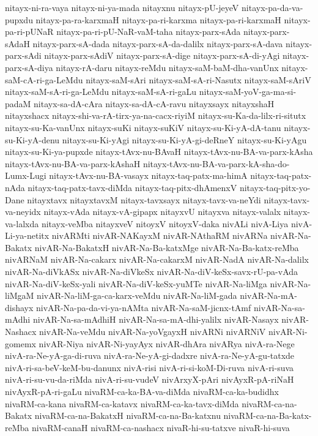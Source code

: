 {nitayx-ni-ra-vaya
nitayx-ni-ya-mada
nitayxnu
nitayx-pU-jeyeV
nitayx-pa-da-va-pupxdu
nitayx-pa-ra-karxmaH
nitayx-pa-ri-karxma
nitayx-pa-ri-karxmaH
nitayx-pa-ri-pUNaR
nitayx-pa-ri-pU-NaR-vaM-taha
nitayx-parx-sAda
nitayx-parx-sAdaH
nitayx-parx-sA-dada
nitayx-parx-sA-da-dalilx
nitayx-parx-sA-dava
nitayx-parx-sAdi
nitayx-parx-sAdiV
nitayx-parx-sA-dige
nitayx-parx-sA-di-yAgi
nitayx-parx-sA-diya
nitayx-rA-daru
nitayx-reMdu
nitayx-saM-baM-dha-vanUnx
nitayx-saM-cA-ri-ga-LeMdu
nitayx-saM-sAri
nitayx-saM-sA-ri-Nasutx
nitayx-saM-sAriV
nitayx-saM-sA-ri-ga-LeMdu
nitayx-saM-sA-ri-gaLu
nitayx-saM-yoV-ga-ma-si-padaM
nitayx-sa-dA-cAra
nitayx-sa-dA-cA-ravu
nitayxsayx
nitayxshaH
nitayxshacx
nitayx-shi-va-rA-tirx-ya-na-cacx-riyiM
nitayx-su-Ka-da-lilx-ri-situtx
nitayx-su-Ka-vanUnx
nitayx-suKi
nitayx-suKiV
nitayx-su-Ki-yA-dA-tanu
nitayx-su-Ki-yA-denu
nitayx-su-Ki-yAgi
nitayx-su-Ki-yA-gi-deRneY
nitayx-su-Ki-yAgu
nitayx-su-Ki-ya-pupxde
nitayx-tAvx-nu-BAvaH
nitayx-tAvx-nu-BA-va-parx-kAsha
nitayx-tAvx-nu-BA-va-parx-kAshaH
nitayx-tAvx-nu-BA-va-parx-kA-sha-do-Lumx-Lugi
nitayx-tAvx-nu-BA-vasayx
nitayx-taq-patx-ma-himA
nitayx-taq-patx-nAda
nitayx-taq-patx-tavx-diMda
nitayx-taq-pitx-dhAmenxV
nitayx-taq-pitx-yo-Dane
nitayxtavx
nitayxtavxM
nitayx-tavxsayx
nitayx-tavx-va-neYdi
nitayx-tavx-va-neyidx
nitayx-vAda
nitayx-vA-gipapx
nitayxvU
nitayxva
nitayx-valalx
nitayx-va-lalxda
nitayx-veMba
nitayxveV
nitoyxV
nitoyxV-daka
nivALi
nivA-Liya
nivA-Li-ya-netitx
nivARMti
nivAR-NAKayxM
nivAR-NAthaRM
nivARNa
nivAR-Na-Bakatx
nivAR-Na-BakatxH
nivAR-Na-Ba-katxMge
nivAR-Na-Ba-katx-reMba
nivARNaM
nivAR-Na-cakarx
nivAR-Na-cakarxM
nivAR-NadA
nivAR-Na-dalilx
nivAR-Na-diVkASx
nivAR-Na-diVkeSx
nivAR-Na-diV-keSx-savx-rU-pa-vAda
nivAR-Na-diV-keSx-yali
nivAR-Na-diV-keSx-yuMTe
nivAR-Na-liMga
nivAR-Na-liMgaM
nivAR-Na-liM-ga-ca-karx-veMdu
nivAR-Na-liM-gada
nivAR-Na-mA-dishayx
nivAR-Na-pa-da-vi-ya-nAMta
nivAR-Na-saM-jicnx-tAmf
nivAR-Na-sa-mAdhi
nivAR-Na-sa-mAdhiH
nivAR-Na-sa-mA-dhi-yalilx
nivAR-Nasayx
nivAR-Nashacx
nivAR-Na-veMdu
nivAR-Na-yoVgayxH
nivARNi
nivARNiV
nivAR-Ni-gomemx
nivAR-Niya
nivAR-Ni-yayAyx
nivAR-dhAra
nivARya
nivA-ra-Nege
nivA-ra-Ne-yA-ga-di-ruva
nivA-ra-Ne-yA-gi-dadxre
nivA-ra-Ne-yA-gu-tatxde
nivA-ri-sa-beV-keM-bu-danunx
nivA-risi
nivA-ri-si-koM-Di-ruva
nivA-ri-suva
nivA-ri-su-vu-da-riMda
nivA-ri-su-vudeV
nivArxyX-pAri
nivAyxR-pA-riNaH
nivAyxR-pA-ri-gaLu
nivaRM-ca-ka-BA-va-diMda
nivaRM-ca-ka-budidhx
nivaRM-ca-kana
nivaRM-ca-katavx
nivaRM-ca-ka-tavx-diMda
nivaRM-ca-na-Bakatx
nivaRM-ca-na-BakatxH
nivaRM-ca-na-Ba-katxnu
nivaRM-ca-na-Ba-katx-reMba
nivaRM-canaH
nivaRM-ca-nashacx
nivaR-hi-su-tatxve
nivaR-hi-suva
}
